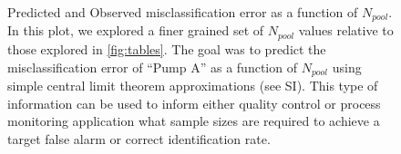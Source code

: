 \documentclass[%
reprint,
superscriptaddress,
 aps,
 pre,
]{revtex4-1}
\begin{document}
\begin{figure} [htb]  %
 \center 
    \def\pw{1.}
            \begin{minipage}[b]{.975\linewidth} %
    \end{minipage}


       

    \caption{\footnotesize Predicted and Observed misclassification error \cite{buonaccorsi_text2010} as a function of $N_{pool}$.  In this plot, we explored a finer grained set of $N_{pool}$ values relative to those explored in \ref{fig:tables}.  The goal was to predict the misclassification error of ``Pump A'' as a function of $N_{pool}$ using simple central limit theorem approximations (see SI).  This type of information can be used to inform either quality control or process monitoring application what sample sizes are required to achieve a target false alarm or correct identification rate. 
      \label{fig:errordecay}}
\end{figure}
\end{document}
